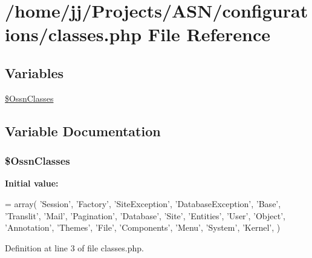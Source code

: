 \hypertarget{classes_8php}{}\section{/home/jj/\+Projects/\+A\+S\+N/configurations/classes.php File Reference}
\label{classes_8php}
\subsection*{Variables}
\begin{DoxyCompactItemize}
\item 
\hyperlink{classes_8php_a74d4c0e6359b7bc92b5760882827a2a2}{\$\+Ossn\+Classes}
\end{DoxyCompactItemize}


\subsection{Variable Documentation}
\subsubsection[{\texorpdfstring{\$\+Ossn\+Classes}{$OssnClasses}}]{\setlength{\rightskip}{0pt plus 5cm}\$Ossn\+Classes}\hypertarget{classes_8php_a74d4c0e6359b7bc92b5760882827a2a2}{}\label{classes_8php_a74d4c0e6359b7bc92b5760882827a2a2}
{\bfseries Initial value\+:}
\begin{DoxyCode}
= array(
        \textcolor{stringliteral}{'Session'},
        \textcolor{stringliteral}{'Factory'},
        \textcolor{stringliteral}{'SiteException'},
        \textcolor{stringliteral}{'DatabaseException'},
        \textcolor{stringliteral}{'Base'},
        \textcolor{stringliteral}{'Translit'},
        \textcolor{stringliteral}{'Mail'},
        \textcolor{stringliteral}{'Pagination'},
        \textcolor{stringliteral}{'Database'},
        \textcolor{stringliteral}{'Site'},
        \textcolor{stringliteral}{'Entities'},
        \textcolor{stringliteral}{'User'},
        \textcolor{stringliteral}{'Object'},
        \textcolor{stringliteral}{'Annotation'},
        \textcolor{stringliteral}{'Themes'},
        \textcolor{stringliteral}{'File'},
        \textcolor{stringliteral}{'Components'},
        \textcolor{stringliteral}{'Menu'},
        \textcolor{stringliteral}{'System'},
        \textcolor{stringliteral}{'Kernel'},
)
\end{DoxyCode}


Definition at line 3 of file classes.\+php.

